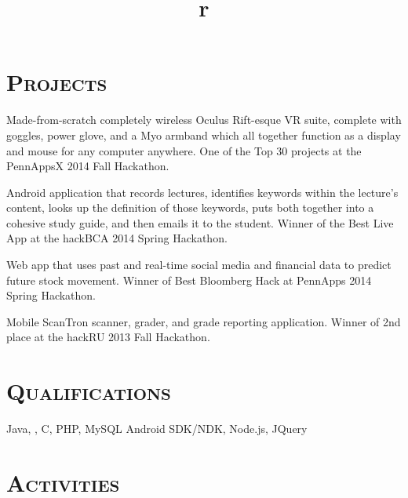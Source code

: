 \begin{resume}
\section{\textsc{Projects}}

\begin{position}
Made-from-scratch completely wireless Oculus Rift-esque VR suite, complete with goggles, power glove, and a Myo armband which all together function as a display and mouse for any computer anywhere. One of the Top 30 projects at the PennAppsX 2014 Fall Hackathon.
\end{position}

\begin{position}
Android application that records lectures, identifies keywords within the lecture's content, looks up the definition of those keywords, puts both together into a cohesive study guide, and then emails it to the student. Winner of the Best Live App at the hackBCA 2014 Spring Hackathon. 
\end{position}

\begin{position}
Web app that uses past and real-time social media and financial data to predict future stock movement. Winner of Best Bloomberg Hack at PennApps 2014 Spring Hackathon.
\end{position}

\begin{position}
Mobile ScanTron scanner, grader, and grade reporting application. Winner of 2nd place at the hackRU 2013 Fall Hackathon.
\end{position}

\section{\textsc{Qualifications}}
Java, \Cplusplus, C, PHP, MySQL Android SDK/NDK, Node.js, JQuery
\section{\textsc{Activities}}

\begin{formatb}
  \title{r}\\
  \body\\
\end{formatb}


\end{resume}
